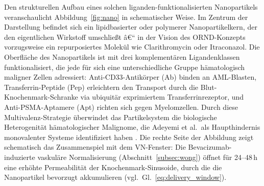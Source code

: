 ﻿\documentclass[12pt,a4paper]{article}
\theoremstyle{definition}
\begin{document}
Den strukturellen Aufbau eines solchen liganden-funktionalisierten Nanopartikels
veranschaulicht Abbildung~\ref{fig:nano} in schematischer Weise. Im Zentrum der
Darstellung befindet sich ein lipidbasierter oder polymerer Nanopartikelkern, der
den eigentlichen Wirkstoff umschließt â€“ in der Vision des ORND-Konzepts vorzugsweise
ein repurposiertes Molekül wie Clarithromycin oder Itraconazol. Die Oberfläche des
Nanopartikels ist mit drei komplementären Ligandenklassen funktionalisiert, die
jede für sich eine unterschiedliche Gruppe hämatologisch maligner Zellen adressiert:
Anti-CD33-Antikörper (Ab) binden an AML-Blasten, Transferrin-Peptide (Pep)
erleichtern den Transport durch die Blut-Knochenmark-Schranke via ubiquitär
exprimiertem Transferrinrezeptor, und Anti-PSMA-Aptamere (Apt) richten sich gegen
Myelomzellen. Durch diese Multivalenz-Strategie überwindet das Partikelsystem die
biologische Heterogenität hämatologischer Malignome, die Adeyemi et al.\ als
Haupthindernis monovalenter Systeme identifiziert haben \cite{adeyemi2025}.
Die rechte Seite der Abbildung zeigt schematisch das Zusammenspiel mit dem
VN-Fenster: Die Bevacizumab-induzierte vaskuläre Normalisierung (Abschnitt~\ref{subsec:wong})
öffnet für 24--48\,h eine erhöhte Permeabilität der Knochenmark-Sinusoide,
durch die die Nanopartikel bevorzugt akkumulieren (vgl.~Gl.~\eqref{eq:delivery_window}).
\end{document}
